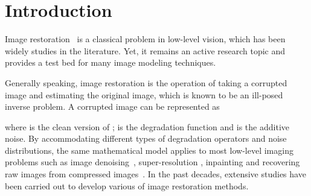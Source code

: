 \documentclass[10pt,journal,compsoc]{IEEEtran}
\begin{document}
\maketitle
\IEEEdisplaynontitleabstractindextext
\IEEEpeerreviewmaketitle



\tableofcontents
\clearpage





\section{Introduction}




Image restoration~\cite{DBLP:conf/iccv/MairalBPSZ09,DBLP:journals/tip/DongZSL13,
DBLP:journals/pami/SchmidtJNRR16,DBLP:conf/cvpr/SchmidtR14,DBLP:conf/iccv/ZoranW11}
is a classical problem in low-level vision, which has been widely studies in the literature.
Yet, it remains an active research topic and provides a test bed for many image modeling techniques.

Generally speaking, image restoration is the operation of taking a corrupted image and
estimating the original image, which is known to be an ill-posed inverse problem. A corrupted
image  can be represented as

where  is the clean version of ;   is the degradation function and  is the additive
noise. By accommodating different types of degradation operators and noise distributions, the same mathematical model
applies to most  low-level imaging problems such as image denoising~\cite{DBLP:conf/cvpr/LiuXZG15,
DBLP:conf/iccv/ChenZY15,DBLP:conf/iccv/XuZZZF15,DBLP:conf/cvpr/GuZZF14}, super-resolution
    \cite{DBLP:conf/accv/TimofteSG14,DBLP:conf/cvpr/YangLC13,DBLP:conf/cvpr/ZhuZY14,DBLP:conf/cvpr/ZhuZ0Y15,
DBLP:conf/iccv/RieglerSRB15,DBLP:conf/iccv/GuZXMFZ15,DBLP:conf/iccv/WangLYHH15}, inpainting
    \cite{DBLP:conf/nips/XieXC12,DBLP:journals/ijcv/RothB09,DBLP:journals/tip/MairalES08} and recovering raw
images from compressed images~\cite{DBLP:conf/iccv/DongDLT15,DBLP:journals/tip/FoiKE07,DBLP:conf/eccv/JancsaryNR12}.
In the past decades, extensive studies have been carried out to develop various of image restoration methods.
\end{document}

